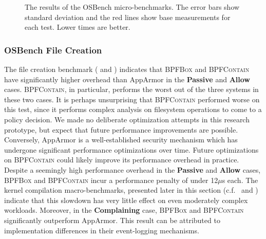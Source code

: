 \documentclass[
  fontsize=12pt,
  titlepage=firstiscover,
  paper=letter,
oneside,
  cleardoublepage=plain,
  parskip=half-,
  DIV=10,
  parindent,
  appendixprefix,
  chapterprefix,
  listof=totoc,
]{scrbook}
\newcommand{\bpfbox}{\textsc{BPFBox}}
\newcommand{\bpfcontain}{\textsc{BPFContain}}
\begin{document}
\begin{figure}[htp]
  \caption[The results of the OSBench micro-benchmarks]{
    The results of the OSBench micro-benchmarks. The error bars show standard
    deviation and the red lines show base measurements for each test. Lower times are
    better.
  }\label{fig:osbench}
\end{figure}

\subsubsection{OSBench File Creation}

The file creation benchmark ( and )
indicates that \bpfbox{} and \bpfcontain{} have significantly higher overhead than
AppArmor in the \textbf{Passive} and \textbf{Allow} cases. \bpfcontain{}, in particular,
performs the worst out of the three systems in these two cases. It is perhaps unsurprising
that \bpfcontain{} performed worse on this test, since it performs complex analysis on
filesystem operations to come to a policy decision. We made no deliberate optimization
attempts in this research prototype, but expect that future performance improvements are
possible.  Conversely, AppArmor is a well-established security mechanism which has
undergone significant performance optimizations over time. Future optimizations on
\bpfcontain{} could likely improve its performance overhead in practice. Despite
a seemingly high performance overhead in the \textbf{Passive} and \textbf{Allow} cases,
\bpfbox{} and \bpfcontain{} incur a performance penalty of under 12$\mu$s each.  The
kernel compilation macro-benchmarks, presented later in this section
(c.f.\  and ) indicate that
this slowdown has very little effect on even moderately complex workloads.  Moreover, in
the \textbf{Complaining} case, \bpfbox{} and \bpfcontain{} significantly outperform
AppArmor. This result can be attributed to implementation differences in their
event-logging mechanisms.
\end{document}
